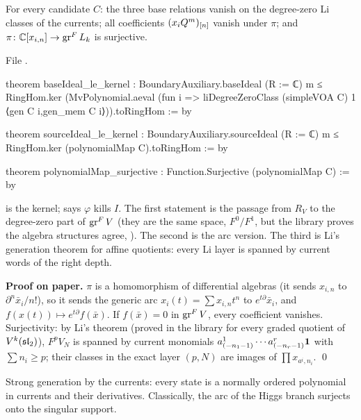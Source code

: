 \begin{theorem}\label{l20:thm:m0arc}
For every candidate $C$: the three base relations vanish on the degree-zero Li classes of the currents; all
coefficients $(x_iQ^m)_{[n]}$ vanish under $\pi$; and $\pi\colon{\mathbb{C}}[x_{i,n}]\to\operatorname{gr}^F L_k$ is surjective.
\end{theorem}
\noindent File .
\begin{leancode}
theorem baseIdeal_le_kernel : BoundaryAuxiliary.baseIdeal (R := ℂ) m ≤
    RingHom.ker (MvPolynomial.aeval (fun i =>
      liDegreeZeroClass (simpleVOA C) 1 ⟨gen C i,gen_mem C i⟩)).toRingHom := by

theorem sourceIdeal_le_kernel : BoundaryAuxiliary.sourceIdeal (R := ℂ) m ≤
    RingHom.ker (polynomialMap C).toRingHom := by

theorem polynomialMap_surjective : Function.Surjective (polynomialMap C) := by
\end{leancode}

\begin{dictionary}
 is the kernel;  says $\varphi$ kills $I$. The first statement is the passage from
$R_V$ to the degree-zero part of $\operatorname{gr}^F V$ (they are the same space, $F^0/F^1$, but the library proves the
algebra structures agree, ). The second is the arc version. The third is Li's generation
theorem for affine quotients: every Li layer is spanned by current words of the right depth.
\end{dictionary}

\textbf{Proof on paper.} $\pi$ is a homomorphism of differential algebras (it sends $x_{i,n}$ to
$\partial^n\bar x_i/n!$), so it sends the generic arc $x_i(t)=\sum x_{i,n}t^n$ to $e^{t\partial}\bar x_i$, and
$f(x(t))\mapsto e^{t\partial}f(\bar x)$. If $f(\bar x)=0$ in $\operatorname{gr}^F V$, every coefficient vanishes. Surjectivity:
by Li's theorem (proved in the library for every graded quotient of $V^k(\mathfrak{sl}_2)$), $F^pV_N$ is spanned by current
monomials $a^1_{(-n_1-1)}\cdots a^r_{(-n_r-1)}\mathbf{1}$ with $\sum n_i\ge p$; their classes in the exact layer
$(p,N)$ are images of $\prod x_{a^i,n_i}$. \qed

\begin{physics}
Strong generation by the currents: every state is a normally ordered polynomial in currents and their
derivatives. Classically, the arc of the Higgs branch surjects onto the singular support.
\end{physics}

